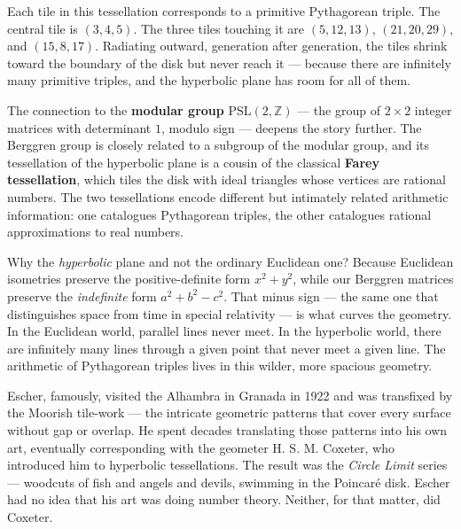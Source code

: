 \documentclass[11pt,openright,twoside]{book}
\theoremstyle{definition}
\begin{document}
Each tile in this tessellation corresponds to a primitive Pythagorean triple. The central tile is $(3, 4, 5)$. The three tiles touching it are $(5, 12, 13)$, $(21, 20, 29)$, and $(15, 8, 17)$. Radiating outward, generation after generation, the tiles shrink toward the boundary of the disk but never reach it --- because there are infinitely many primitive triples, and the hyperbolic plane has room for all of them.

The connection to the \textbf{modular group} $\text{PSL}(2, \mathbb{Z})$ --- the group of $2 \times 2$ integer matrices with determinant $1$, modulo sign --- deepens the story further. The Berggren group is closely related to a subgroup of the modular group, and its tessellation of the hyperbolic plane is a cousin of the classical \textbf{Farey tessellation}, which tiles the disk with ideal triangles whose vertices are rational numbers. The two tessellations encode different but intimately related arithmetic information: one catalogues Pythagorean triples, the other catalogues rational approximations to real numbers.

Why the \textit{hyperbolic} plane and not the ordinary Euclidean one? Because Euclidean isometries preserve the positive-definite form $x^2 + y^2$, while our Berggren matrices preserve the \textit{indefinite} form $a^2 + b^2 - c^2$. That minus sign --- the same one that distinguishes space from time in special relativity --- is what curves the geometry. In the Euclidean world, parallel lines never meet. In the hyperbolic world, there are infinitely many lines through a given point that never meet a given line. The arithmetic of Pythagorean triples lives in this wilder, more spacious geometry.

Escher, famously, visited the Alhambra in Granada in 1922 and was transfixed by the Moorish tile-work --- the intricate geometric patterns that cover every surface without gap or overlap. He spent decades translating those patterns into his own art, eventually corresponding with the geometer H. S. M. Coxeter, who introduced him to hyperbolic tessellations. The result was the \textit{Circle Limit} series --- woodcuts of fish and angels and devils, swimming in the Poincaré disk. Escher had no idea that his art was doing number theory. Neither, for that matter, did Coxeter.
\end{document}
